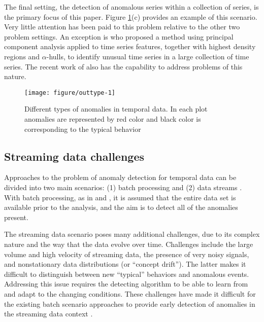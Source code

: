 \documentclass[12pt]{article}
\begin{document}
The final setting, the detection of anomalous series within a collection
of series, is the primary focus of this paper. Figure
\ref{fig:outtype}(c) provides an example of this scenario. Very little
attention has been paid to this problem relative to the other two
problem settings. An exception is \citet{hyndman2015large} who proposed
a method using principal component analysis applied to time series
features, together with highest density regions and \(\alpha\)-hulls, to
identify unusual time series in a large collection of time series. The
recent work of \citet{wilkinsonvisualizing} also has the capability to
address problems of this nature.

\begin{figure}[ht]

{\centering \texttt{[image: figure/outtype-1]} 

}

\caption{Different types of anomalies in temporal data. In each plot anomalies are represented by red color and black color is corresponding to the typical behavior}\label{fig:outtype}
\end{figure}

\hypertarget{streaming-data-challenges}{%
\subsection{Streaming data challenges}\label{streaming-data-challenges}}

Approaches to the problem of anomaly detection for temporal data can be
divided into two main scenarios: (1) batch processing and (2) data
streams \citep{faria2016novelty, luts2014real}. With batch processing,
as in \citet{hyndman2015large} and \citet{wilkinsonvisualizing}, it is
assumed that the entire data set is available prior to the analysis, and
the aim is to detect all of the anomalies present.

The streaming data scenario poses many additional challenges, due to its
complex nature and the way that the data evolve over time. Challenges
include the large volume and high velocity of streaming data, the
presence of very noisy signals, and nonstationary data distributions (or
``concept drift''). The latter makes it difficult to distinguish between
new ``typical'' behaviors and anomalous events. Addressing this issue
requires the detecting algorithm to be able to learn from and adapt to
the changing conditions. These challenges have made it difficult for the
existing batch scenario approaches to provide early detection of
anomalies in the streaming data context \citep{faria2016novelty}.
\end{document}
